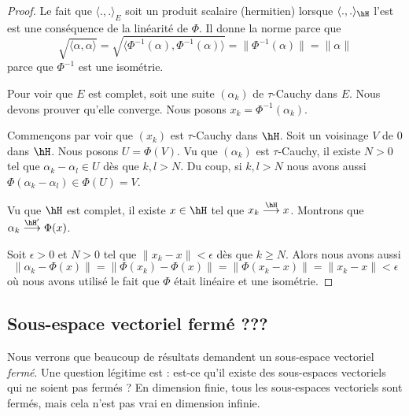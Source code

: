 \begin{proof}
    Le fait que \( \langle ., .\rangle_E\) soit un produit scalaire (hermitien) lorsque \( \langle ., .\rangle_{\hH}\) l'est est une conséquence de la linéarité de \( \Phi\). Il donne la norme parce que
    \begin{equation}
        \sqrt{ \langle \alpha , \alpha\rangle  }=\sqrt{ \langle \Phi^{-1}(\alpha), \Phi^{-1}(\alpha)\rangle  }=\| \Phi^{-1}(\alpha) \|=\| \alpha \|
    \end{equation}
    parce que \( \Phi^{-1}\) est une isométrie.

    Pour voir que \( E\) est complet, soit une suite \( (\alpha_k)\) de \( \tau\)-Cauchy dans \( E\). Nous devons prouver qu'elle converge. Nous posons \( x_k=\Phi^{-1}(\alpha_k)\).

    Commençons par voir que \( (x_k)\) est \( \tau\)-Cauchy dans \( \hH\). Soit un voisinage \( V\) de \( 0\) dans \( \hH\). Nous posons \( U=\Phi(V)\). Vu que \( (\alpha_k)\) est \( \tau\)-Cauchy, il existe \( N>0\) tel que \( \alpha_k-\alpha_l\in U\) dès que \( k,l>N\). Du coup, si \( k,l>N\) nous avons aussi \( \Phi(\alpha_k-\alpha_l)\in \Phi(U)=V\).

    Vu que \( \hH\) est complet, il existe \( x\in \hH\) tel que \( x_k\stackrel{\hH}{\longrightarrow}x\). Montrons que \( \alpha_k\stackrel{\hH'}{\longrightarrow}\Phi(x)\).

    Soit \( \epsilon>0\) et \( N>0\) tel que \( \| x_k-x \|<\epsilon\) dès que \( k\geq N\). Alors nous avons aussi
    \begin{equation}
        \| \alpha_k-\Phi(x) \|=\| \Phi(x_k)-\Phi(x) \|=\| \Phi(x_k-x) \|=\| x_k-x \|<\epsilon
    \end{equation}
    où nous avons utilisé le fait que \( \Phi\) était linéaire et une isométrie.
\end{proof}

\subsection{Sous-espace vectoriel fermé ???}

Nous verrons que beaucoup de résultats demandent un sous-espace vectoriel \emph{fermé}. Une question légitime est : est-ce qu'il existe des sous-espaces vectoriels qui ne soient pas fermés ? En dimension finie, tous les sous-espaces vectoriels sont fermés, mais cela n'est pas vrai en dimension infinie.

